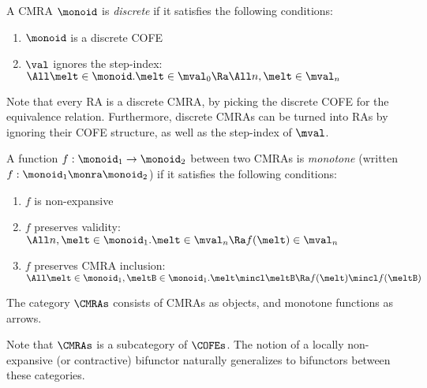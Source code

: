 \begin{defn}
  A CMRA $\monoid$ is \emph{discrete} if it satisfies the following conditions:
  \begin{enumerate}[itemsep=0pt]
  \item $\monoid$ is a discrete COFE
  \item $\val$ ignores the step-index: \\
    $\All \melt \in \monoid. \melt \in \mval_0 \Ra \All n, \melt \in \mval_n$
  \end{enumerate}
\end{defn}
Note that every RA is a discrete CMRA, by picking the discrete COFE for the equivalence relation.
Furthermore, discrete CMRAs can be turned into RAs by ignoring their COFE structure, as well as the step-index of $\mval$.

\begin{defn}
  A function $f : \monoid_1 \to \monoid_2$ between two CMRAs is \emph{monotone} (written $f : \monoid_1 \monra \monoid_2$) if it satisfies the following conditions:
  \begin{enumerate}[itemsep=0pt]
  \item $f$ is non-expansive
  \item $f$ preserves validity: \\
    $\All n, \melt \in \monoid_1. \melt \in \mval_n \Ra f(\melt) \in \mval_n$
  \item $f$ preserves CMRA inclusion:\\
    $\All \melt \in \monoid_1, \meltB \in \monoid_1. \melt \mincl \meltB \Ra f(\melt) \mincl f(\meltB)$
  \end{enumerate}
\end{defn}

\begin{defn}
  The category $\CMRAs$ consists of CMRAs as objects, and monotone functions as arrows.
\end{defn}
Note that $\CMRAs$ is a subcategory of $\COFEs$.
The notion of a locally non-expansive (or contractive) bifunctor naturally generalizes to bifunctors between these categories.


